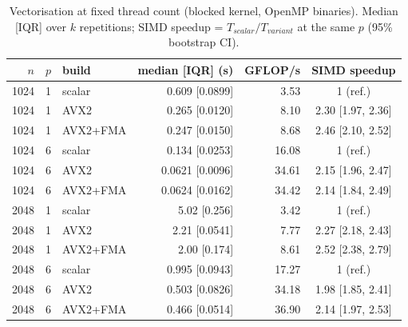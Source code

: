 \begin{table}[t]
\centering
\caption{Vectorisation at fixed thread count (blocked kernel, OpenMP binaries). Median [IQR] over $k$ repetitions; SIMD speedup = $T_{scalar}/T_{variant}$ at the same $p$ (95\% bootstrap CI).}
\label{tab:vec}
\footnotesize
\setlength{\tabcolsep}{3pt}
\begin{tabular}{@{}rrlrrc@{}}
\toprule
$n$ & $p$ & build & median [IQR] (s) & GFLOP/s & SIMD speedup \\
\midrule
1024 & 1 & scalar & 0.609 [0.0899] & 3.53 & 1 (ref.) \\
1024 & 1 & AVX2 & 0.265 [0.0120] & 8.10 & 2.30 [1.97, 2.36] \\
1024 & 1 & AVX2+FMA & 0.247 [0.0150] & 8.68 & 2.46 [2.10, 2.52] \\
1024 & 6 & scalar & 0.134 [0.0253] & 16.08 & 1 (ref.) \\
1024 & 6 & AVX2 & 0.0621 [0.0096] & 34.61 & 2.15 [1.96, 2.47] \\
1024 & 6 & AVX2+FMA & 0.0624 [0.0162] & 34.42 & 2.14 [1.84, 2.49] \\
2048 & 1 & scalar & 5.02 [0.256] & 3.42 & 1 (ref.) \\
2048 & 1 & AVX2 & 2.21 [0.0541] & 7.77 & 2.27 [2.18, 2.43] \\
2048 & 1 & AVX2+FMA & 2.00 [0.174] & 8.61 & 2.52 [2.38, 2.79] \\
2048 & 6 & scalar & 0.995 [0.0943] & 17.27 & 1 (ref.) \\
2048 & 6 & AVX2 & 0.503 [0.0826] & 34.18 & 1.98 [1.85, 2.41] \\
2048 & 6 & AVX2+FMA & 0.466 [0.0514] & 36.90 & 2.14 [1.97, 2.53] \\
\bottomrule
\end{tabular}
\end{table}
